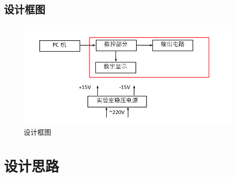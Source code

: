 \documentclass[a4paper]{article}
\newcommand{\sectionbreak}{\clearpage} %
\theoremstyle{definition}
\theoremstyle{plain}
\theoremstyle{remark}
\begin{document}
\subsection{设计框图}
\vspace*{-2em}
\begin{figure}[H]
	\centering
	\includegraphics[width=1\textwidth]{设计框图}
	\caption{设计框图}
	\label{E8}
\end{figure}

\sectionbreak


\section{设计思路}
\end{document}

